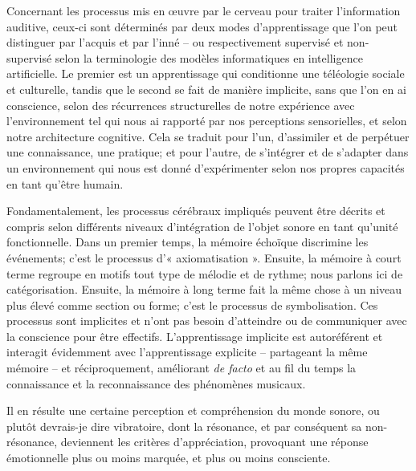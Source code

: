 Concernant les processus mis en œuvre par le cerveau pour traiter l'information auditive, ceux-ci sont déterminés par deux modes d'apprentissage que l'on peut distinguer par l'acquis et par l'inné -- ou respectivement supervisé et non-supervisé selon la terminologie des modèles informatiques en intelligence artificielle. Le premier est un apprentissage qui conditionne une téléologie sociale et culturelle, tandis que le second se fait de manière implicite, sans que l'on en ai conscience, selon des récurrences structurelles de notre expérience avec l'environnement tel qui nous ai rapporté par nos perceptions sensorielles, et selon notre architecture cognitive. Cela se traduit pour l'un, d'assimiler et de perpétuer une connaissance, une pratique; et pour l'autre, de s'intégrer et de s'adapter dans un environnement qui nous est donné d'expérimenter selon nos propres capacités en tant qu'être humain.

Fondamentalement, les processus cérébraux impliqués peuvent être décrits et compris selon différents niveaux d'intégration de l'objet sonore en tant qu'unité fonctionnelle. Dans un premier temps, la mémoire échoïque discrimine les événements; c'est le processus d'« axiomatisation ». Ensuite, la mémoire à court terme regroupe en motifs tout type de mélodie et de rythme; nous parlons ici de catégorisation. Ensuite, la mémoire à long terme fait la même chose à un niveau plus élevé comme section ou forme; c'est le processus de symbolisation. Ces processus sont implicites et n'ont pas besoin d'atteindre ou de communiquer avec la conscience pour être effectifs. L'apprentissage implicite est autoréférent et interagit évidemment avec l'apprentissage explicite -- partageant la même mémoire -- et réciproquement, améliorant \textit{de facto} et au fil du temps la connaissance et la reconnaissance des phénomènes musicaux.

Il en résulte une certaine perception et compréhension du monde sonore, ou plutôt devrais-je dire vibratoire, dont la résonance, et par conséquent sa non-résonance, deviennent les critères d'appréciation, provoquant une réponse émotionnelle plus ou moins marquée, et plus ou moins consciente.

\bigskip


